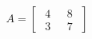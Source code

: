 \documentclass[preview]{standalone}
\begin{document}
\begin{align*}
A = \begin{bmatrix}
                        \text{ 4 } & \text{ 8 }\\
                        \text{ 3 } & \text{ 7 }
                    \end{bmatrix}
\end{align*}
\end{document}
